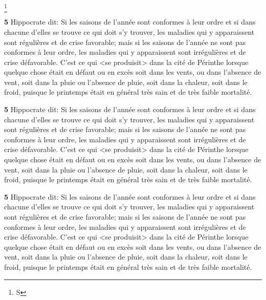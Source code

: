\documentclass[12pt,a4paper]{memoir}
\begin{document}
\begin{pages}
\begin{Leftside}
\ledsectnotoc

\footnote{S}
\beginnumbering


\pstart\vspace{2.1\baselineskip}
\textbf{5}
Hippocrate dit: Si les saisons de l'année sont conformes à leur ordre
et si dans chacune d'elles se trouve ce qui doit s'y trouver, les
maladies qui y apparaissent sont régulières et de crise
favorable; mais si les saisons de l'année ne sont pas
conformes à leur ordre, les maladies qui y apparaissent sont irrégulières
et de crise défavorable. C'est ce qui <se produisit> dans la cité de Périnthe
lorsque quelque chose était en défaut ou en excès soit dans les vents,
ou dans l'absence de vent, soit dans la pluie ou l'absence de pluie,
soit dans la chaleur, soit dans le froid, puisque le printemps était
en général très sain et de très faible mortalité.
\pend

\pstart\vspace{2.1\baselineskip}
\textbf{5}
Hippocrate dit: Si les saisons de l'année sont conformes à leur ordre
et si dans chacune d'elles se trouve ce qui doit s'y trouver, les
maladies qui y apparaissent sont régulières et de crise favorable;
mais si les saisons de l'année ne sont pas conformes à leur ordre, les
maladies qui y apparaissent sont irrégulières et de crise
défavorable. C'est ce qui <se produisit> dans la cité de Périnthe
lorsque quelque chose était en défaut ou en excès soit dans les vents,
ou dans l'absence de vent, soit dans la pluie ou l'absence de pluie,
soit dans la chaleur, soit dans le froid, puisque le printemps était
en général très sain et de très faible mortalité.
\pend

\pstart\vspace{2.1\baselineskip}
\textbf{5}
Hippocrate dit: Si les saisons de l'année sont conformes à leur ordre
et si dans chacune d'elles se trouve ce qui doit s'y trouver, les
maladies qui y apparaissent sont régulières et de crise favorable;
mais si les saisons de l'année ne sont pas conformes à leur ordre, les
maladies qui y apparaissent sont irrégulières et de crise
défavorable. C'est ce qui <se produisit> dans la cité de Périnthe
lorsque quelque chose était en défaut ou en excès soit dans les vents,
ou dans l'absence de vent, soit dans la pluie ou l'absence de pluie,
soit dans la chaleur, soit dans le froid, puisque le printemps était
en général très sain et de très faible mortalité.
\pend


\end{Leftside}
\end{pages}
\end{document}
